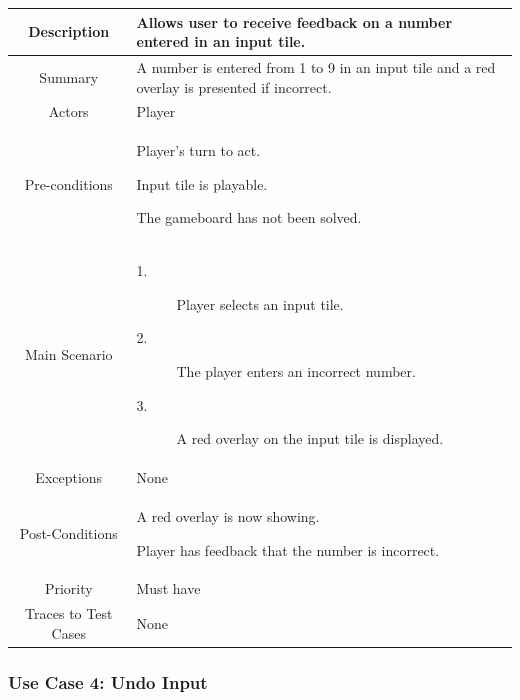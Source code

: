 \documentclass[12pt]{article}
\begin{document}
\begin{table}[htbp]
\begin{center}
\begin{tabular}{| c | m{10cm} |}
\hline
\cellcolor{lightgray}Description & Allows user to receive feedback on a number entered in an input tile. \\
\hline
\cellcolor{lightgray}Summary & A number is entered from 1 to 9 in an input tile and a red overlay is presented if incorrect. \\
\hline
\cellcolor{lightgray}Actors & Player \\
\hline
\cellcolor{lightgray}Pre-conditions &
\begin{description}[font=$\bullet$~\normalfont\scshape]
\item Player's turn to act.
\item Input tile is playable. 
\item The gameboard has not been solved.
\end{description}\\
\hline
\cellcolor{lightgray}Main Scenario & 
\begin{description}
\item [1.]Player selects an input tile.
\item [2.]The player enters an incorrect number. 
\item [3.]A red overlay on the input tile is displayed.
\end{description}\\
\hline
\cellcolor{lightgray}Exceptions & None \\
\hline
\cellcolor{lightgray}Post-Conditions & 
\begin{description}[font=$\bullet$~\normalfont\scshape]
\item A red overlay is now showing.
\item Player has feedback that the number is incorrect.
\end{description}\\
\hline
\cellcolor{lightgray}Priority & Must have \\
\hline
\cellcolor{lightgray}Traces to Test Cases & None \\
\hline
\end{tabular}
\end{center}
\end{table}

\clearpage

\subsubsection{Use Case 4: Undo Input} \label{uc:2}
\end{document}
